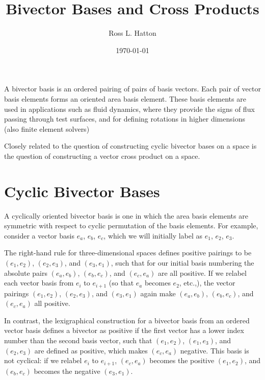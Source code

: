 \documentclass[11pt]{article}
\newcommand{\bv}[1][]{e_{#1}}
\newcommand{\bp}[2]{(#1,#2)}
\begin{document}
\title{Bivector Bases and Cross Products}
\author{Ross L. Hatton}
\date{\today}
\maketitle

A bivector basis is an ordered pairing of pairs of basis vectors. Each pair of vector basis elements forms an oriented area basis element. These basis elements are used in applications such as fluid dynamics, where they provide the signs of flux passing through test surfaces, and for defining rotations in higher dimensions (also finite element solvers)

Closely related to the question of constructing cyclic bivector bases on a space is the question of constructing a vector cross product on a space. 

\section{Cyclic Bivector Bases}


A cyclically oriented bivector basis is one in which the area basis elements are symmetric with respect to cyclic permutation of the basis elements. For example, consider a vector basis $\bv[a]$, $\bv[b]$, $\bv[c]$, which we will initially label as $\bv[1]$, $\bv[2]$, $\bv[3]$. 


The right-hand rule for three-dimensional spaces defines positive pairings to be $\bp{\bv[1]}{\bv[2]}$, $\bp{\bv[2]}{\bv[3]}$, and $\bp{\bv[3]}{\bv[1]}$, such that for our initial basis numbering the absolute pairs $\bp{\bv[a]}{\bv[b]}$, $\bp{\bv[b]}{\bv[c]}$, and $\bp{\bv[c]}{\bv[a]}$ are all positive. If we relabel each vector basis from $\bv[i]$ to $\bv[i+1]$ (so that $\bv[a]$ becomes $\bv[2]$, etc.,), the vector pairings $\bp{\bv[1]}{\bv[2]}$, $\bp{\bv[2]}{\bv[3]}$, and $\bp{\bv[3]}{\bv[1]}$ again make $\bp{\bv[a]}{\bv[b]}$, $\bp{\bv[b]}{\bv[c]}$, and $\bp{\bv[c]}{\bv[a]}$ all positive.



In contrast, the lexigraphical construction for a bivector basis from an ordered vector basis defines a bivector as positive if the first vector has a lower index number than the second basis vector, such that $\bp{\bv[1]}{\bv[2]}$, $\bp{\bv[1]}{\bv[3]}$, and $\bp{\bv[2]}{\bv[3]}$ are defined as positive, which makes $\bp{\bv[c]}{\bv[a]}$ negative. This basis is not cyclical: if we relabel $\bv[i]$ to $\bv[i+1]$, $\bp{\bv[c]}{\bv[a]}$ becomes the positive $\bp{\bv[1]}{\bv[2]}$, and $\bp{\bv[b]}{\bv[c]}$ becomes the negative $\bp{\bv[3]}{\bv[1]}$.
\end{document}
